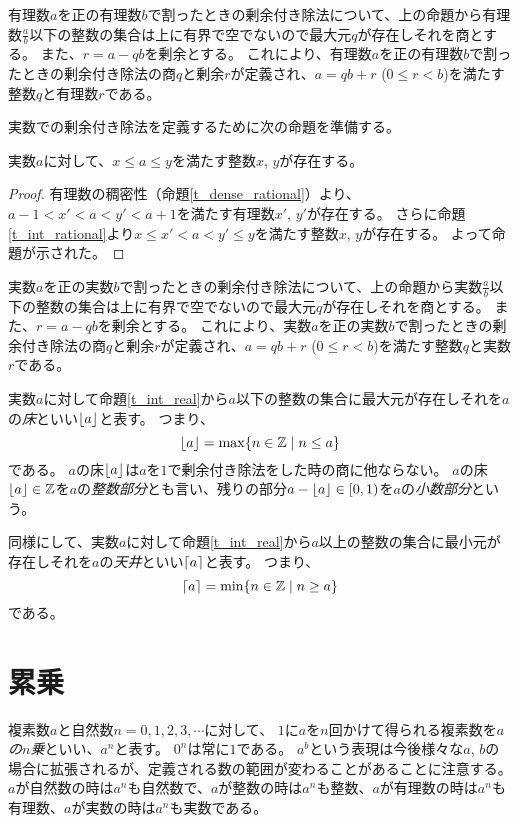 有理数$a$を正の有理数$b$で割ったときの剰余付き除法について、上の命題から有理数$\frac{a}{b}$以下の整数の集合は上に有界で空でないので最大元$q$が存在しそれを商とする。
また、$r = a-q b$を剰余とする。
これにより、有理数$a$を正の有理数$b$で割ったときの剰余付き除法の商$q$と剰余$r$が定義され、$a = q b+r$ ($0 \le r < b$)を満たす整数$q$と有理数$r$である。

実数での剰余付き除法を定義するために次の命題を準備する。

\begin{proposition}
\label{t_int_real}
実数$a$に対して、$x \le a \le y$を満たす整数$x$, $y$が存在する。
\end{proposition}

\begin{proof}
有理数の稠密性（命題\ref{t_dense_rational}）より、$a-1 < x' < a < y' < a+1$を満たす有理数$x'$, $y'$が存在する。
さらに命題\ref{t_int_rational}より$x \le x' < a < y' \le y$を満たす整数$x$, $y$が存在する。
よって命題が示された。
\end{proof}

実数$a$を正の実数$b$で割ったときの剰余付き除法について、上の命題から実数$\frac{a}{b}$以下の整数の集合は上に有界で空でないので最大元$q$が存在しそれを商とする。
また、$r = a-q b$を剰余とする。
これにより、実数$a$を正の実数$b$で割ったときの剰余付き除法の商$q$と剰余$r$が定義され、$a = q b+r$ ($0 \le r < b$)を満たす整数$q$と実数$r$である。

実数$a$に対して命題\ref{t_int_real}から$a$以下の整数の集合に最大元が存在しそれを$a$の\emph{床}といい$\lfloor a\rfloor$と表す。
つまり、
$$
\lfloor a\rfloor = \max\{ n \in \mathbb{Z} \mid n \le a \}
$$
である。
$a$の床$\lfloor a\rfloor$は$a$を$1$で剰余付き除法をした時の商に他ならない。
$a$の床$\lfloor a\rfloor \in \mathbb{Z}$を$a$の\emph{整数部分}とも言い、残りの部分$a-\lfloor a\rfloor \in [0, 1)$を$a$の\emph{小数部分}という。

同様にして、実数$a$に対して命題\ref{t_int_real}から$a$以上の整数の集合に最小元が存在しそれを$a$の\emph{天井}といい$\lceil a\rceil$と表す。
つまり、
$$
\lceil a\rceil = \min\{ n \in \mathbb{Z} \mid n \ge a \}
$$
である。

\section{累乗}

複素数$a$と自然数$n = 0, 1, 2, 3, \cdots$に対して、
$1$に$a$を$n$回かけて得られる複素数を\emph{$a$の$n$乗}といい、$a^n$と表す。
$0^n$は常に$1$である。
$a^b$という表現は今後様々な$a$, $b$の場合に拡張されるが、定義される数の範囲が変わることがあることに注意する。
$a$が自然数の時は$a^n$も自然数で、$a$が整数の時は$a^n$も整数、$a$が有理数の時は$a^n$も有理数、$a$が実数の時は$a^n$も実数である。

